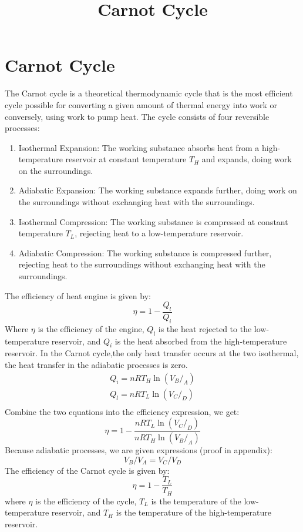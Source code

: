 \documentclass[11pt]{article}
\title{Carnot Cycle}
\author{}
\begin{document}
\maketitle
\section{Carnot Cycle}
    The Carnot cycle is a theoretical thermodynamic cycle that is the most efficient cycle possible for converting a given amount of thermal energy into work or conversely, using work to pump heat. The cycle consists of four reversible processes:
    \begin{enumerate}
        \item Isothermal Expansion: The working substance absorbs heat from a high-temperature reservoir at constant temperature $T_H$ and expands, doing work on the surroundings.
        \item Adiabatic Expansion: The working substance expands further, doing work on the surroundings without exchanging heat with the surroundings.
        \item Isothermal Compression: The working substance is compressed at constant temperature $T_L$, rejecting heat to a low-temperature reservoir.
        \item Adiabatic Compression: The working substance is compressed further, rejecting heat to the surroundings without exchanging heat with the surroundings.
    \end{enumerate}
    The efficiency of heat engine is given by:
    \[\eta = 1- \frac{Q_l}{Q_i}\]
    Where $\eta$ is the efficiency of the engine, $Q_l$ is the heat rejected
to the low-temperature reservoir, and $Q_i$ is the heat absorbed from the
high-temperature reservoir.
    In the Carnot cycle,the only heat transfer occurs at the two isothermal,
the heat transfer in the adiabatic processes is zero.
\begin{gather*}
    Q_i = nRT_H \ln(V_B/_A)\\
    Q_l = nRT_L \ln(V_C/_D)\\
\end{gather*}
Combine the two equations into the efficiency expression, we get:
\[\eta = 1 - \frac{nRT_L \ln(V_C/_D)}{nRT_H \ln(V_B/_A)}\]
Because adiabatic processes, we are given expressions (proof in appendix):
\[V_B/V_A = V_C/V_D\]
    The efficiency of the Carnot cycle is given by:
    \[\eta = 1 - \frac{T_L}{T_H}\]
    where $\eta$ is the efficiency of the cycle, $T_L$ is the temperature of the low-temperature reservoir, and $T_H$ is the temperature of the high-temperature reservoir.
\Appendix
\end{document}
